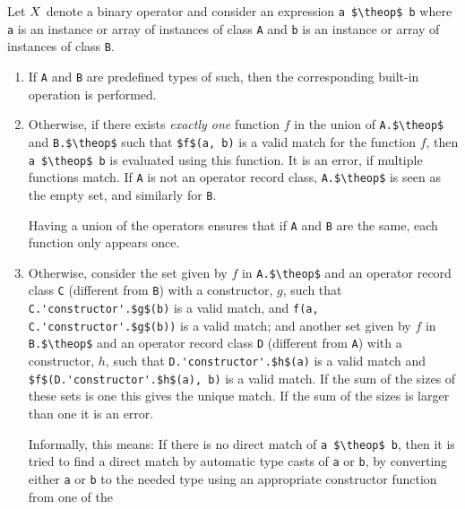 Let $X$ denote a binary operator and consider an expression
\lstinline[mathescape=true]!a $\theop$ b! where \lstinline!a! is an instance or array of instances of
class \lstinline!A! and \lstinline!b! is an instance or array of instances of
class \lstinline!B!.

\begin{enumerate}
\item
  If \lstinline!A! and \lstinline!B! are predefined types of such, then the
  corresponding built-in operation is performed.
\item
  Otherwise, if there exists \emph{exactly one} function $f$ in the
  union of \lstinline[mathescape=true]!A.$\theop$! and \lstinline[mathescape=true]!B.$\theop$! such that
  \lstinline[mathescape=true]!$f$(a, b)! is a valid match for the function $f$, then
  \lstinline[mathescape=true]!a $\theop$ b! is evaluated using this function. It is an error, if
  multiple functions match. If \lstinline!A! is not an operator record class, \lstinline[mathescape=true]!A.$\theop$!
  is seen as the empty set, and similarly for \lstinline!B!.
  \begin{nonnormative}
  Having a union of the operators ensures that if \lstinline!A! and \lstinline!B! are the same, each function only appears once.
  \end{nonnormative}
\item
  Otherwise, consider the set given by $f$ in \lstinline[mathescape=true]!A.$\theop$!
  and an operator record class \lstinline!C! (different from \lstinline!B!) with a
  constructor, $g$, such that \lstinline[mathescape=true]!C.'constructor'.$g$(b)! is a valid match, and
  \lstinline[mathescape=true]!f(a, C.'constructor'.$g$(b))! is a valid match; and another set given by
  $f$ in \lstinline[mathescape=true]!B.$\theop$! and an operator record class \lstinline!D!
  (different from \lstinline!A!) with a constructor, $h$, such that
  \lstinline[mathescape=true]!D.'constructor'.$h$(a)! is a valid match and \lstinline[mathescape=true]!$f$(D.'constructor'.$h$(a), b)!
  is a valid match. If the sum of the sizes of these sets is one this
  gives the unique match. If the sum of the sizes is larger than one it
  is an error.
\begin{nonnormative}
  Informally, this means: If there is no direct match of \lstinline[mathescape=true]!a $\theop$ b!, then it is tried to find a direct match by automatic type casts
  of \lstinline!a! or \lstinline!b!, by converting either \lstinline!a! or \lstinline!b! to the needed
  type using an appropriate constructor function from one of the

\end{nonnormative}
\end{enumerate}
